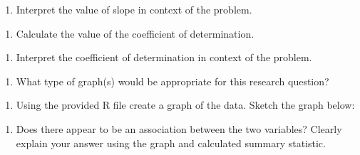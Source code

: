 \documentclass[
]{report}
\providecommand{\tightlist}{%
  \setlength{\itemsep}{0pt}\setlength{\parskip}{0pt}}
\begin{document}
\begin{enumerate}
\def\labelenumi{\alph{enumi}.}
\setcounter{enumi}{3}
\tightlist
\item
  Interpret the value of slope in context of the problem.
\end{enumerate}

\vspace{0.8in}

\begin{enumerate}
\def\labelenumi{\alph{enumi}.}
\setcounter{enumi}{4}
\tightlist
\item
  Calculate the value of the coefficient of determination.
\end{enumerate}

\vspace{0.3in}

\begin{enumerate}
\def\labelenumi{\alph{enumi}.}
\setcounter{enumi}{5}
\tightlist
\item
  Interpret the coefficient of determination in context of the problem.
\end{enumerate}

\vspace{0.8in}

\begin{enumerate}
\def\labelenumi{\alph{enumi}.}
\setcounter{enumi}{6}
\tightlist
\item
  What type of graph(s) would be appropriate for this research question?
\end{enumerate}

\newpage

\begin{enumerate}
\def\labelenumi{\alph{enumi}.}
\setcounter{enumi}{7}
\tightlist
\item
  Using the provided R file create a graph of the data. Sketch the graph below:
\end{enumerate}

\vspace{2in}

\begin{enumerate}
\def\labelenumi{\roman{enumi}.}
\tightlist
\item
  Does there appear to be an association between the two variables? Clearly explain your answer using the graph and calculated summary statistic.
\end{enumerate}

\vspace{0.8in}
\end{document}
